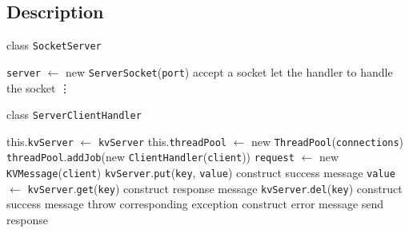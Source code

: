 \documentclass{article}
\begin{document}
\subsection{Description}
\begin{algorithm}
    \caption{class \texttt{SocketServer}}
	\begin{algorithmic}
            \State \texttt{server} $\leftarrow$ new \texttt{ServerSocket}(\texttt{port})
        \EndProcedure
                \State accept a socket
                \State let the handler to handle the socket
            \EndWhile
            \State \vdots
        \EndProcedure
	\end{algorithmic}
\end{algorithm}

\begin{algorithm}
    \caption{class \texttt{ServerClientHandler}}
	\begin{algorithmic}
            \State this.\texttt{kvServer} $\leftarrow$ \texttt{kvServer}
            \State this.\texttt{threadPool} $\leftarrow$ new \texttt{ThreadPool}(\texttt{connections})
        \EndProcedure
            \State \texttt{threadPool}.\texttt{addJob}(new \texttt{ClientHandler}(\texttt{client}))
        \EndProcedure
            \State \texttt{request} $\leftarrow$ new \texttt{KVMessage}(\texttt{client})
                \State \texttt{kvServer}.\texttt{put}(\texttt{key}, \texttt{value})
                \State construct success message
                \State \texttt{value} $\leftarrow$ \texttt{kvServer}.\texttt{get}(\texttt{key})
                \State construct response message
                \State \texttt{kvServer}.\texttt{del}(\texttt{key})
                \State construct success message
            \Else
                \State throw corresponding exception
            \EndIf
                \State construct error message
            \EndIf
            \State send response
        \EndProcedure
	\end{algorithmic}
\end{algorithm}
\end{document}
